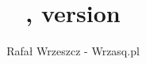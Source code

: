 %


\usepackage[utf8]{inputenc}
\usepackage{indentfirst}
\usepackage{fancyhdr}
\usepackage{hyperref}

\pagestyle{fancy}
\lhead{\chilldevTitle}
\rhead{\rightmark}
\cfoot{\thepage}%

\title{\chilldevTitle, version \chilldevVersion}
\author{Rafał Wrzeszcz - Wrzasq.pl}

